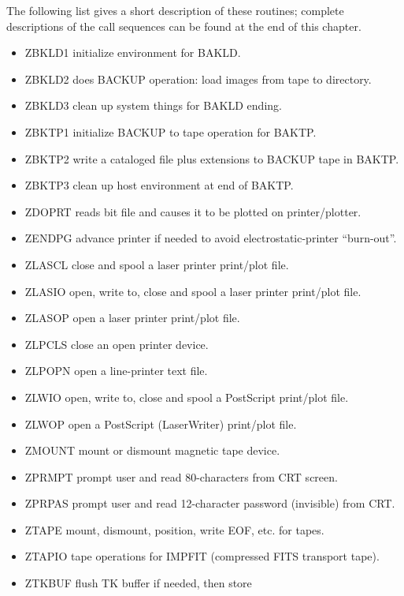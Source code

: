 The following list gives a short description of these routines;
complete descriptions of the call sequences can be found at the end of
this chapter.
\begin{itemize} %
\item ZBKLD1  initialize environment for BAKLD.
\item ZBKLD2  does BACKUP operation: load images from
tape to directory.
\item ZBKLD3  clean up system things for BAKLD ending.
\item ZBKTP1  initialize BACKUP to tape operation for
BAKTP.
\item ZBKTP2  write a cataloged file plus extensions to
BACKUP tape in BAKTP.
\item ZBKTP3  clean up host environment at end of BAKTP.
\item ZDOPRT  reads bit file and causes it to be plotted
on printer/plotter.
\item ZENDPG  advance printer if needed to avoid
electrostatic-printer ``burn-out''.
\item ZLASCL  close and spool a laser printer print/plot
file.
\item ZLASIO  open, write to, close and spool a laser
printer print/plot file.
\item ZLASOP  open a laser printer print/plot file.
\item ZLPCLS  close an open printer device.
\item ZLPOPN  open a line-printer text file.
\item ZLWIO   open, write to, close and spool a
PostScript print/plot file.
\item ZLWOP   open a PostScript (LaserWriter) print/plot
file.
\item ZMOUNT  mount or dismount magnetic tape device.
\item ZPRMPT  prompt user and read 80-characters from
CRT screen.
\item ZPRPAS  prompt user and read 12-character password
(invisible) from CRT.
\item ZTAPE   mount, dismount, position, write EOF, etc.
for tapes.
\item ZTAPIO  tape operations for IMPFIT (compressed
FITS transport tape).
\item ZTKBUF  flush TK buffer if needed, then store

\end{itemize}
